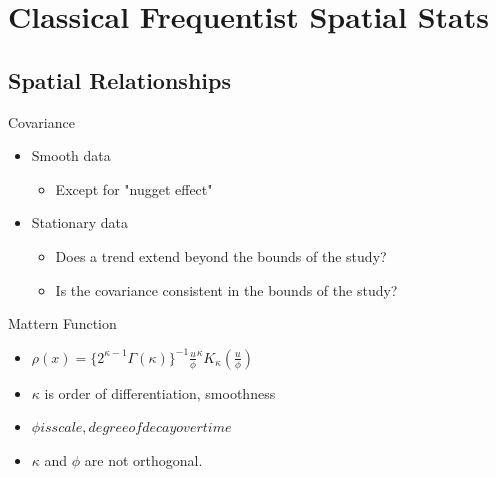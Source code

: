 \documentclass{beamer}
\begin{document}
\section{Classical Frequentist Spatial Stats}
\subsection{Spatial Relationships}
\begin{frame}{Covariance}{}
  \begin{itemize}
  \item {
    Smooth data
    \begin{itemize}
    	\item Except for "nugget effect"
    \end{itemize}
  }
  \item {
    Stationary data
	\begin{itemize}
   		\item Does a trend extend beyond the bounds of the study?
   		\item Is the covariance consistent in the bounds of the study?
    \end{itemize}
  }
  \end{itemize}
\end{frame}

\begin{frame}{Mattern Function}{}
  \begin{itemize}
  \item { 
  		$\rho(x) =\{2^{\kappa-1} \Gamma(\kappa)\}^{-1} \frac{u}{\phi}^\kappa K_\kappa (\frac{u}{\phi})$
  }
  \item {
    $\kappa$ is order of differentiation, smoothness
  }
  \item{
  	$\phi is scale, degree of decay over time$
  }
  \item{
  	$\kappa$ and $\phi$ are not orthogonal.
  }
  \end{itemize}
\end{frame}
\end{document}
